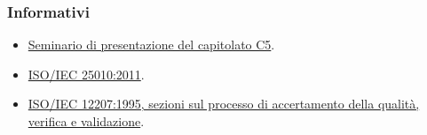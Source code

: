 \documentclass[../piano-di-qualifica.tex]{subfiles}
\begin{document}
\subsubsection{Informativi}%
\label{par:informativi}
\begin{itemize}
  \item \href{https://www.math.unipd.it/~tullio/IS-1/2019/Dispense/C5a.pdf}{Seminario di presentazione del capitolato C5}.
  \item \href{https://iso25000.com/index.php/en/iso-25000-standards/iso-25010}{ISO/IEC 25010:2011}.
  \item \href{https://www.math.unipd.it/~tullio/IS-1/2009/Approfondimenti/ISO_12207-1995.pdf}{ISO/IEC 12207:1995, sezioni sul processo di accertamento della qualità, verifica e validazione}.
\end{itemize}
\end{document}

